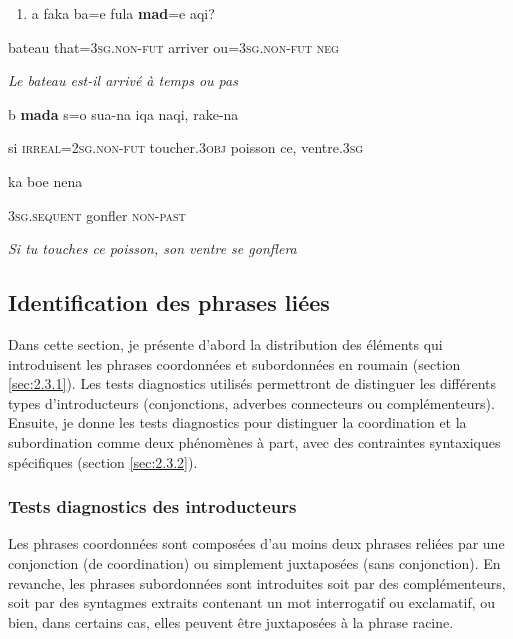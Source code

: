 \begin{enumerate}
\item \label{bkm:Ref300162349}a  faka  ba=e  fula  \textbf{mad}=e  aqi?


\end{enumerate}
bateau  that=\textsc{3sg.non-fut}  arriver  ou=\textsc{3sg.non-fut  neg}

{\itshape
Le bateau est-il arrivé à temps ou pas~}

  b  \textbf{mada}  s=o  sua-na  iqa  naqi,  rake-na

si  \textsc{irreal=2sg.non-fut } toucher.3\textsc{obj } poisson  ce,  ventre.\textsc{3sg } 

    ka  boe  nena

\textsc{3sg.sequent}  gonfler  \textsc{non-past}

    \textit{Si tu touches ce poisson, son ventre se gonflera}

\subsection{Identification des phrases liées}
\label{bkm:Ref301427467}Dans cette section, je présente d'abord la distribution des éléments qui introduisent les phrases coordonnées et subordonnées en roumain (section \ref{sec:2.3.1}). Les tests diagnostics utilisés permettront de distinguer les différents types d'introducteurs (conjonctions, adverbes connecteurs ou complémenteurs). Ensuite, je donne les tests diagnostics pour distinguer la coordination et la subordination comme deux phénomènes à part, avec des contraintes syntaxiques spécifiques (section \ref{sec:2.3.2}). 

\subsubsection{Tests diagnostics des introducteurs}
\label{bkm:Ref300787466}Les phrases coordonnées sont composées d'au moins deux phrases reliées par une conjonction (de coordination) ou simplement juxtaposées (sans conjonction). En revanche, les phrases subordonnées sont introduites soit par des complémenteurs, soit par des syntagmes extraits contenant un mot interrogatif ou exclamatif, ou bien, dans certains cas, elles peuvent être juxtaposées à la phrase racine.

